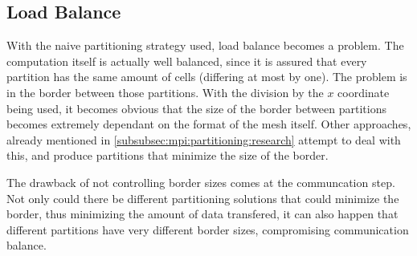 \subsection{Load Balance}
\label{subsec:mpi:load}


With the naive partitioning strategy used, load balance becomes a problem. The computation itself is actually well balanced, since it is assured that every partition has the same amount of cells (differing at most by one). The problem is in the border between those partitions. With the division by the $x$ coordinate being used, it becomes obvious that the size of the border between partitions becomes extremely dependant on the format of the mesh itself. Other approaches, already mentioned in \cref{subsubsec:mpi:partitioning:research} attempt to deal with this, and produce partitions that minimize the size of the border.

The drawback of not controlling border sizes comes at the communcation step. Not only could there be different partitioning solutions that could minimize the border, thus minimizing the amount of data transfered, it can also happen that different partitions have very different border sizes, compromising communication balance.
